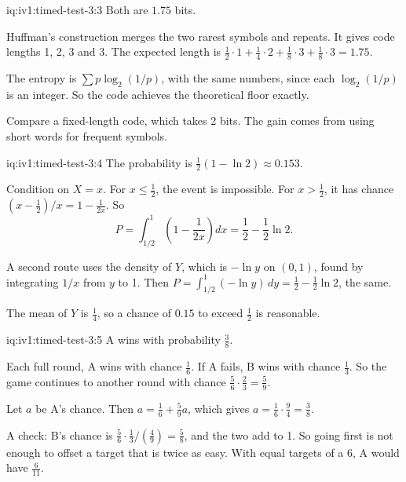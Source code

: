 \enlargethispage{-3\baselineskip}%
\begin{solution}{iq:iv1:timed-test-3:3}
Both are $1.75$ bits.

Huffman's construction merges the two rarest symbols and repeats. It gives code lengths 1, 2, 3 and 3. The expected length is $\frac12 \cdot 1 + \frac14 \cdot 2 + \frac18 \cdot 3 + \frac18 \cdot 3 = 1.75$.

The entropy is $\sum p\log_2(1/p)$, with the same numbers, since each $\log_2(1/p)$ is an integer. So the code achieves the theoretical floor exactly.

Compare a fixed-length code, which takes 2 bits. The gain comes from using short words for frequent symbols.

\end{solution}

\begin{solution}{iq:iv1:timed-test-3:4}
The probability is $\frac12(1 - \ln 2) \approx 0.153$.

Condition on $X = x$. For $x \le \frac12$, the event is impossible. For $x > \frac12$, it has chance $(x - \frac12)/x = 1 - \frac{1}{2x}$. So
\[
P = \int_{1/2}^1\left(1 - \frac{1}{2x}\right)dx = \frac12 - \frac12\ln 2.
\]

A second route uses the density of $Y$, which is $-\ln y$ on $(0, 1)$, found by integrating $1/x$ from $y$ to 1. Then $P = \int_{1/2}^1(-\ln y)\,dy = \frac12 - \frac12\ln 2$, the same.

The mean of $Y$ is $\frac14$, so a chance of $0.15$ to exceed $\frac12$ is reasonable.

\end{solution}

\begin{solution}{iq:iv1:timed-test-3:5}
A wins with probability $\frac38$.

Each full round, A wins with chance $\frac16$. If A fails, B wins with chance $\frac13$. So the game continues to another round with chance $\frac56 \cdot \frac23 = \frac59$.

Let $a$ be A's chance. Then $a = \frac16 + \frac59a$, which gives $a = \frac16 \cdot \frac94 = \frac38$.

A check: B's chance is $\frac56 \cdot \frac13/(\frac49) = \frac58$, and the two add to 1. So going first is not enough to offset a target that is twice as easy. With equal targets of a 6, A would have $\frac{6}{11}$.

\end{solution}

